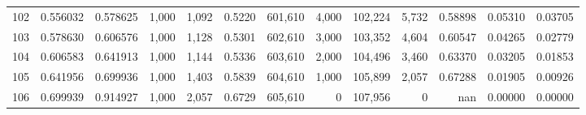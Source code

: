 \begin{tabular}{rrrrrrrrrrrrr}
102 &  0.556032 &  0.578625 &   1,000 &  1,092 &                                     0.5220 &  601,610 &    4,000 &  102,224 &    5,732 &  0.58898 &  0.05310 &  0.03705 \\
103 &  0.578630 &  0.606576 &   1,000 &  1,128 &                                     0.5301 &  602,610 &    3,000 &  103,352 &    4,604 &  0.60547 &  0.04265 &  0.02779 \\
104 &  0.606583 &  0.641913 &   1,000 &  1,144 &                                     0.5336 &  603,610 &    2,000 &  104,496 &    3,460 &  0.63370 &  0.03205 &  0.01853 \\
105 &  0.641956 &  0.699936 &   1,000 &  1,403 &                                     0.5839 &  604,610 &    1,000 &  105,899 &    2,057 &  0.67288 &  0.01905 &  0.00926 \\
106 &  0.699939 &  0.914927 &   1,000 &  2,057 &                                     0.6729 &  605,610 &        0 &  107,956 &        0 &      nan &  0.00000 &  0.00000 \\
\bottomrule
\end{tabular}

